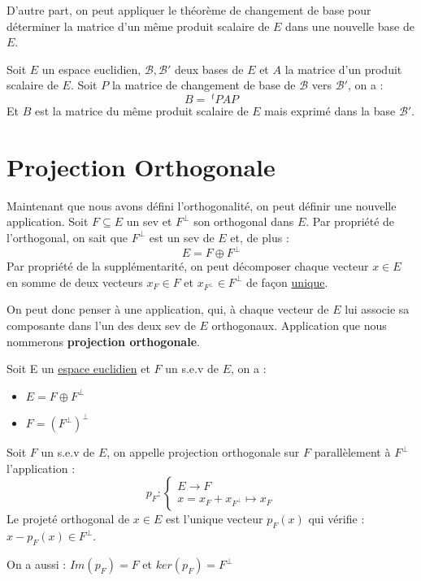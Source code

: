D'autre part, on peut appliquer le théorème de changement de base pour déterminer la matrice d'un même produit 
scalaire de $E$ dans une nouvelle base de $E$. 

\begin{proposition}
    Soit $E$ un espace euclidien, $\mathcal{B},\mathcal{B}'$ deux bases de $E$ et $A$ la matrice d'un produit scalaire de $E$. 
    Soit $P$ la matrice de changement de base de $\mathcal{B}$ vers $\mathcal{B}'$, on a :
        \[ B = \; ^tPAP \] 
    Et $B$ est la matrice du même produit scalaire de $E$ mais exprimé dans la base $\mathcal{B}'$. 
\end{proposition}


\section{Projection Orthogonale}

Maintenant que nous avons défini l'orthogonalité, on peut définir une nouvelle application. 
Soit $F \subseteq E$ un sev et $F^\bot$ son orthogonal dans $E$. Par propriété de l'orthogonal, 
on sait que $F^\bot$ est un sev de $E$ et, de plus :
    \[ E = F \oplus F^\bot \] 
Par propriété de la supplémentarité, on peut décomposer chaque vecteur $x \in E$ en somme de deux vecteurs 
$ x_F \in F$ et $x_{F^\bot} \in F^\bot$ de façon \underline{unique}. 

On peut donc penser à une application, qui, à chaque vecteur de $E$ lui associe sa composante dans l'un des deux sev de $E$ orthogonaux.
Application que nous nommerons \textbf{projection orthogonale}.  

\begin{theorem}
    Soit E un \underline{espace euclidien} et $F$ un s.e.v de $E$, on a :
    \begin{itemize}
        \item $E = F \oplus F^\bot $
        \item $ F = (F^{\bot})^{\bot} $
    \end{itemize}
\end{theorem}

\newpage 

\begin{definition}
    Soit $F$ un s.e.v de $E$, on appelle projection orthogonale sur $F$ parallèlement à $F^{\bot}$ l'application :
    \[ p_F : 
        \begin{cases}
            E \longrightarrow F \\ 
            x = x_F + x_{F^\bot} \mapsto x_F 
        \end{cases}
    \]
    Le projeté orthogonal de $x \in E$ est l'unique vecteur $p_F(x)$ qui vérifie : $ x - p_F(x) \in F^\bot $.

    On a aussi : $ Im(p_F) = F $ et $ ker(p_F) = F^\bot $
\end{definition}


